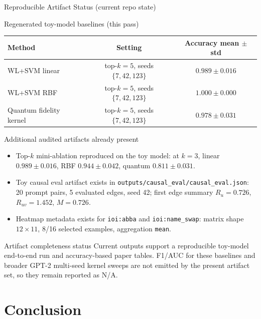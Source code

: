 \documentclass[aspectratio=169,xcolor={dvipsnames}]{beamer}
\begin{document}
\begin{frame}[shrink=24]{Reproducible Artifact Status (current repo state)}
\small
\begin{block}{Regenerated toy-model baselines (this pass)}
\centering
\begin{tabular}{lcc}
Method & Setting & Accuracy mean $\pm$ std \\
\hline
WL+SVM linear & top-$k=5$, seeds $\{7,42,123\}$ & $0.989 \pm 0.016$ \\
WL+SVM RBF & top-$k=5$, seeds $\{7,42,123\}$ & $1.000 \pm 0.000$ \\
Quantum fidelity kernel & top-$k=5$, seeds $\{7,42,123\}$ & $0.978 \pm 0.031$ \\
\end{tabular}
\end{block}

\begin{block}{Additional audited artifacts already present}
\begin{itemize}\setlength\itemsep{2pt}
\item Top-$k$ mini-ablation reproduced on the toy model: at $k=3$, linear $0.989 \pm 0.016$, RBF $0.944 \pm 0.042$, quantum $0.811 \pm 0.031$.
\item Toy causal eval artifact exists in \texttt{outputs/causal_eval/causal_eval.json}: 20 prompt pairs, 5 evaluated edges, seed 42; first edge summary $R_u=0.726$, $R_{uv}=1.452$, $M=0.726$.
\item Heatmap metadata exists for \texttt{ioi:abba} and \texttt{ioi:name\_swap}: matrix shape $12\times 11$, 8/16 selected examples, aggregation \texttt{mean}.
\end{itemize}
\end{block}

\begin{block}{Artifact completeness status}
Current outputs support a reproducible toy-model end-to-end run and accuracy-based paper tables. F1/AUC for these baselines and broader GPT-2 multi-seed kernel sweeps are not emitted by the present artifact set, so they remain reported as N/A.
\end{block}
\end{frame}


\section{Conclusion}
\end{document}
